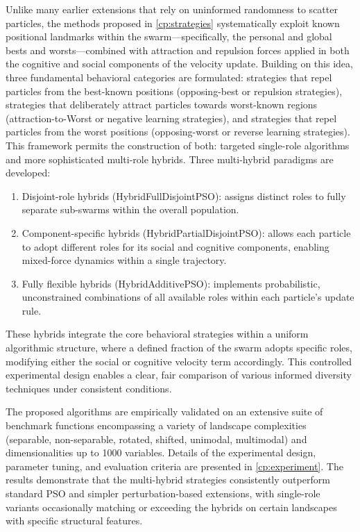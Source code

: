 {Unlike many earlier extensions that rely on uninformed randomness to scatter particles, the methods proposed in \autoref{cp:strategies} systematically exploit known positional landmarks within the swarm---specifically, the personal and global bests and worsts---combined with attraction and repulsion forces applied in both the cognitive and social components of the velocity update. Building on this idea, three fundamental behavioral categories are formulated: strategies that repel particles from the best-known positions (opposing-best or repulsion strategies), strategies that deliberately attract particles towards worst-known regions (attraction-to-Worst or negative learning strategies), and strategies that repel particles from the worst positions (opposing-worst or reverse learning strategies). 
This framework permits the construction of both: targeted single-role algorithms and more sophisticated multi-role hybrids. Three multi-hybrid paradigms are developed:
\begin{enumerate}
    \item Disjoint-role hybrids (HybridFullDisjointPSO): assigns distinct roles to fully separate sub-swarms within the overall population.
    \item Component-specific hybrids (HybridPartialDisjointPSO): allows each particle to adopt different roles for its social and cognitive components, enabling mixed-force dynamics within a single trajectory.
    \item Fully flexible hybrids (HybridAdditivePSO): implements probabilistic, unconstrained combinations of all available roles within each particle’s update rule.
\end{enumerate}
These hybrids integrate the core behavioral strategies within a uniform algorithmic structure, where a defined fraction of the swarm adopts specific roles, modifying either the social or cognitive velocity term accordingly. This controlled experimental design enables a clear, fair comparison of various informed diversity techniques under consistent conditions.

The proposed algorithms are empirically validated on an extensive suite of benchmark functions encompassing a variety of landscape complexities (separable, non-separable, rotated, shifted, unimodal, multimodal) and dimensionalities up to 1000 variables. Details of the experimental design, parameter tuning, and evaluation criteria are presented in \autoref{cp:experiment}.
The results demonstrate that the multi-hybrid strategies consistently outperform standard PSO and simpler perturbation-based extensions, with single-role variants occasionally matching or exceeding the hybrids on certain landscapes with specific structural features.



}
